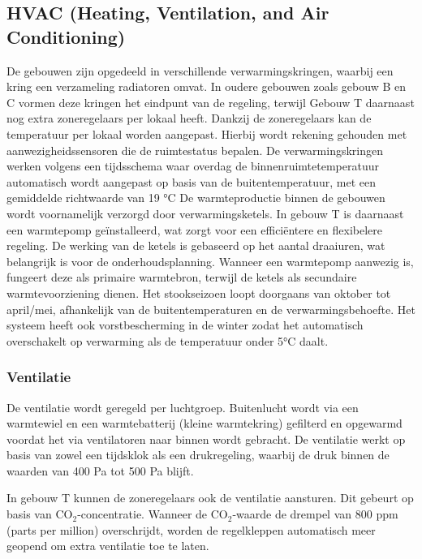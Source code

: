 \subsection{HVAC (Heating, Ventilation, and Air Conditioning)}
De gebouwen zijn opgedeeld in verschillende verwarmingskringen, waarbij een kring een verzameling radiatoren omvat. In oudere gebouwen zoals gebouw B en C vormen deze kringen het eindpunt van de regeling, terwijl Gebouw T daarnaast nog extra zoneregelaars per lokaal heeft. Dankzij de zoneregelaars kan de temperatuur per lokaal worden aangepast. Hierbij wordt rekening gehouden met aanwezigheidssensoren die de ruimtestatus bepalen. \newline \newline
De verwarmingskringen werken volgens een tijdsschema waar overdag de binnenruimtetemperatuur automatisch wordt aangepast op basis van de buitentemperatuur, met een gemiddelde richtwaarde van 19 °C
De warmteproductie binnen de gebouwen wordt voornamelijk verzorgd door verwarmingsketels. In gebouw T is daarnaast een warmtepomp geïnstalleerd, wat zorgt voor een efficiëntere en flexibelere regeling.\newline\newline
De werking van de ketels is gebaseerd op het aantal draaiuren, wat belangrijk is voor de onderhoudsplanning. Wanneer een warmtepomp aanwezig is, fungeert deze als primaire warmtebron, terwijl de ketels als secundaire warmtevoorziening dienen. Het stookseizoen loopt doorgaans van oktober tot april/mei, afhankelijk van de buitentemperaturen en de verwarmingsbehoefte. Het systeem heeft ook vorstbescherming in de winter zodat het automatisch overschakelt op verwarming als de temperatuur onder 5°C daalt.


\subsubsection{Ventilatie}
De ventilatie wordt geregeld per luchtgroep. Buitenlucht wordt via een warmtewiel en een warmtebatterij (kleine warmtekring) gefilterd en opgewarmd voordat het via ventilatoren naar binnen wordt gebracht. De ventilatie werkt op basis van zowel een tijdsklok als een drukregeling, waarbij de druk binnen de waarden van 400 Pa tot 500 Pa blijft.

In gebouw T kunnen de zoneregelaars ook de ventilatie aansturen. Dit gebeurt op basis van CO$_2$-concentratie. Wanneer de CO$_2$-waarde de drempel van 800 ppm (parts per million) overschrijdt, worden de regelkleppen automatisch meer geopend om extra ventilatie toe te laten.


